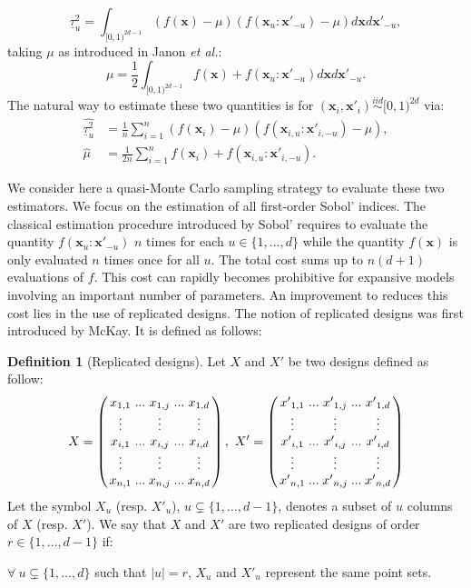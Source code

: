 \documentclass[]{elsarticle}
\theoremstyle{definition}
\newtheorem{defin}{Definition}
\newcommand{\bvec}[1]{\boldsymbol{#1}}
\newcommand{\vx}{\bvec{x}}
\begin{document}
\[\underline{\tau}_u^2  =\int_{[0,1)^{2d-1}}(f(\vx) - \mu) (f(\vx_u:{\vx'}_{-u})-\mu) d\vx d{\vx'}_{-u},\]
taking $\mu$ as introduced in Janon \textit{et al.}:
\[\mu= \frac{1}{2} \int_{[0,1)^{2d-1}}f(\vx)+f(\vx_u:{\vx'}_{-u}) d\vx d{\vx'}_{-u}. \]
The natural way to estimate these two quantities is for $(\vx_i,\vx'_i) \stackrel{iid}{\sim} [0,1)^{2d}$ via:
\begin{align*}
\widehat{\underline{\tau}_u^2} & = \frac{1}{n} \sum \limits_{i=1}^n (f(\vx_i) - \mu) (f(\vx_{i,u}:{\vx'}_{i,-u})-\mu),\\
\widehat{\mu} & = \frac{1}{2n} \sum \limits_{i=1}^n f(\vx_i) +f(\vx_{i,u}:{\vx'}_{i,-u}).
\end{align*}
\bigskip

We consider here a quasi-Monte Carlo sampling strategy to evaluate these two estimators. We focus on the estimation of all first-order Sobol' indices. The classical estimation procedure introduced by Sobol' requires to evaluate the quantity $f(\vx_u:{\vx'}_{-u})$ $n$ times for each $u \in \{1,\dots,d\}$ while the quantity $f(\vx)$ is only evaluated $n$ times once for all $u$. The total cost sums up to $n(d+1)$ evaluations of $f$. This cost can rapidly becomes prohibitive for expansive models involving an important number of parameters. An improvement to reduces this cost lies in the use of replicated designs. The notion of replicated designs was first introduced by McKay. It is defined as follows:
\begin{defin}[Replicated designs]
Let $X$ and $X'$ be two designs defined as follow:
\[\arraycolsep=1.3pt
X=\left(\begin{array}{ccccc}
x_{1,1} & ... & x_{1,j} & ... & x_{1,d} \\
\vdots &  & \vdots & & \vdots \\
x_{i,1} & ... & x_{i,j} & ... & x_{i,d} \\
\vdots &  & \vdots & & \vdots \\
x_{n,1} & ... & x_{n,j} & ... & x_{n,d} \\
\end{array} \right), \ X'=\left(\begin{array}{ccccc}
{x'}_{1,1} & ... & {x'}_{1,j} & ... & {x'}_{1,d} \\
\vdots &  & \vdots & & \vdots \\
{x'}_{i,1} & ... & {x'}_{i,j} & ... & {x'}_{i,d} \\
\vdots &  & \vdots & & \vdots \\
{x'}_{n,1} & ... & {x'}_{n,j} & ... & {x'}_{n,d} \\
\end{array} \right) 
\]
Let the symbol $X_u$ (resp. $X'_u$), $u \subsetneq \{1,\dots,d-1\}$, denotes a subset of $u$ columns of $X$ (resp. $X'$). We say that $X$ and $X'$ are two replicated designs of order $r \in \{1,\dots,d-1\}$ if:

$\forall \ u \subsetneq \{1,\dots,d\}$ such that $|u|=r$, $X_u$ and $X'_u$ represent the same point sets.
\end{defin}
\end{document}
